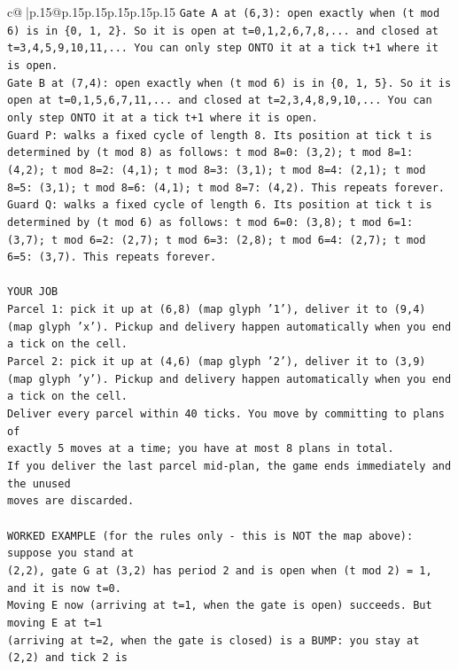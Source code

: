 \documentclass{article}
\begin{document}
{\begin{supertabular}{c@{$\;$}|p{.15\linewidth}@{}p{.15\linewidth}p{.15\linewidth}p{.15\linewidth}p{.15\linewidth}p{.15\linewidth}}
{{{\texttt{Gate A at (6,3): open exactly when (t mod 6) is in \{0, 1, 2\}. So it is open at t=0,1,2,6,7,8,... and closed at t=3,4,5,9,10,11,... You can only step ONTO it at a tick t+1 where it is open.} \\
\texttt{Gate B at (7,4): open exactly when (t mod 6) is in \{0, 1, 5\}. So it is open at t=0,1,5,6,7,11,... and closed at t=2,3,4,8,9,10,... You can only step ONTO it at a tick t+1 where it is open.} \\
\texttt{Guard P: walks a fixed cycle of length 8. Its position at tick t is determined by (t mod 8) as follows: t mod 8=0: (3,2); t mod 8=1: (4,2); t mod 8=2: (4,1); t mod 8=3: (3,1); t mod 8=4: (2,1); t mod 8=5: (3,1); t mod 8=6: (4,1); t mod 8=7: (4,2). This repeats forever.} \\
\texttt{Guard Q: walks a fixed cycle of length 6. Its position at tick t is determined by (t mod 6) as follows: t mod 6=0: (3,8); t mod 6=1: (3,7); t mod 6=2: (2,7); t mod 6=3: (2,8); t mod 6=4: (2,7); t mod 6=5: (3,7). This repeats forever.} \\
\\ 
\texttt{YOUR JOB} \\
\texttt{Parcel 1: pick it up at (6,8) (map glyph '1'), deliver it to (9,4) (map glyph 'x'). Pickup and delivery happen automatically when you end a tick on the cell.} \\
\texttt{Parcel 2: pick it up at (4,6) (map glyph '2'), deliver it to (3,9) (map glyph 'y'). Pickup and delivery happen automatically when you end a tick on the cell.} \\
\texttt{Deliver every parcel within 40 ticks. You move by committing to plans of} \\
\texttt{exactly 5 moves at a time; you have at most 8 plans in total.} \\
\texttt{If you deliver the last parcel mid{-}plan, the game ends immediately and the unused} \\
\texttt{moves are discarded.} \\
\\ 
\texttt{WORKED EXAMPLE (for the rules only {-} this is NOT the map above): suppose you stand at} \\
\texttt{(2,2), gate G at (3,2) has period 2 and is open when (t mod 2) = 1, and it is now t=0.} \\
\texttt{Moving E now (arriving at t=1, when the gate is open) succeeds. But moving E at t=1} \\
\texttt{(arriving at t=2, when the gate is closed) is a BUMP: you stay at (2,2) and tick 2 is} \\
}}}
\end{supertabular}}
\end{document}
